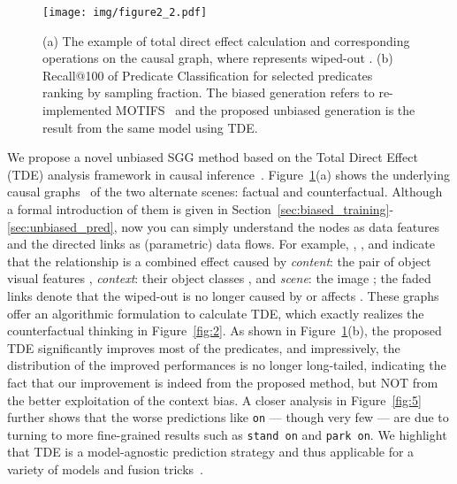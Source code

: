 \documentclass[10pt,twocolumn,letterpaper]{article}
\begin{document}
\begin{figure}[t!]
   \begin{minipage}[b]{1.0\linewidth}
   \centerline{\texttt{[image: img/figure2\_2.pdf]}}
   \end{minipage}
   \caption{(a) The example of total direct effect calculation and corresponding operations on the causal graph, where  represents wiped-out . (b) Recall@100 of Predicate Classification for selected predicates ranking by sampling fraction. The biased generation refers to re-implemented MOTIFS~\cite{zellers2018neural} and the proposed unbiased generation is the result from the same model using TDE.}
   \label{fig:3} \vspace{-0.2in}
\end{figure}

We propose a novel unbiased SGG method based on the Total Direct Effect (TDE) analysis framework in causal inference~\cite{vanderweele2015explanation, pearl2001direct, vanderweele2013three}. Figure~\ref{fig:3}(a) shows the underlying causal graphs~\cite{pearl2016causal, Judea2018thebookofwhy} of the two alternate scenes: factual and counterfactual. Although a formal introduction of them is given in Section~\ref{sec:biased_training}-\ref{sec:unbiased_pred}, now you can simply understand the nodes as data features and the directed links as (parametric) data flows. For example, , , and  indicate that the relationship  is a combined effect caused by \emph{content}: the pair of object visual features , \emph{context}: their object classes , and \emph{scene}: the image ; the faded links denote that the wiped-out  is no longer caused by  or affects . These graphs offer an algorithmic formulation to calculate TDE, which exactly realizes the counterfactual thinking in Figure~\ref{fig:2}. As shown in Figure~\ref{fig:3}(b), the proposed TDE significantly improves most of the predicates, and impressively, the distribution of the improved performances is no longer long-tailed, indicating the fact that our improvement is indeed from the proposed method, but NOT from the better exploitation of the context bias. A closer analysis in Figure~\ref{fig:5} further shows that the worse predictions like \texttt{on} --- though very few --- are due to turning to more fine-grained results such as \texttt{stand on} and \texttt{park on}. We highlight that TDE is a model-agnostic prediction strategy and thus applicable for a variety of models and fusion tricks~\cite{zhang2017visual, zellers2018neural, tang2019learning}.
\end{document}
